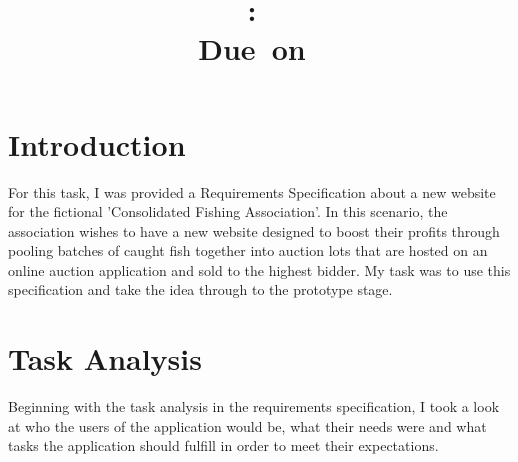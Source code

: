 \documentclass{article}
\title{
\vspace{2in}
\textmd{\textbf{\hmwkClass:\ \hmwkTitle}}\\
\normalsize\vspace{0.1in}\small{Due\ on\ \hmwkDueDate}\\
\vspace{3in}
}
\author{\textbf{\hmwkAuthorName}}
\date{} %
\begin{document}
\maketitle



\newpage
\tableofcontents
\newpage



\section{Introduction}
For this task, I was provided a Requirements Specification\cite{assignment} about a new website for the fictional 'Consolidated Fishing Association'. In this scenario, the association wishes to have a new website designed to boost their profits through pooling batches of caught fish together into auction lots that are hosted on an online auction application and sold to the highest bidder. My task was to use this specification and take the idea through to the prototype stage.



\section{Task Analysis}
Beginning with the task analysis in the requirements specification, I took a look at who the users of the application would be, what their needs were and what tasks the application should fulfill in order to meet their expectations.
\end{document}
